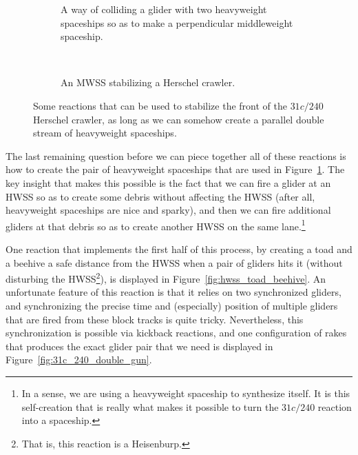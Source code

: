 \begin{figure}[!htb]
	\centering
	\begin{subfigure}[b]{0.43\textwidth}
		\centering
		\caption{A way of colliding a glider with two heavyweight spaceships so as to make a perpendicular middleweight spaceship.}\label{fig:g_2h_to_m}
	\end{subfigure} \ \	\ \ \ \begin{subfigure}[b]{0.53\textwidth}
		\centering
		\caption{An MWSS stabilizing a Herschel crawler.}\label{fig:herschel_mwss_stabilize}
	\end{subfigure}
	\caption{Some reactions that can be used to stabilize the front of the $31c/240$ Herschel crawler, as long as we can somehow create a parallel double stream of heavyweight spaceships.}\label{fig:silverfish_mwss_reactions}
\end{figure}

The last remaining question before we can piece together all of these reactions is how to create the pair of heavyweight spaceships that are used in Figure~\ref{fig:g_2h_to_m}. The key insight that makes this possible is the fact that we can fire a glider at an HWSS so as to create some debris without affecting the HWSS (after all, heavyweight spaceships are nice and sparky), and then we can fire additional gliders at that debris so as to create another HWSS on the same lane.\footnote{In a sense, we are using a heavyweight spaceship to synthesize itself. It is this self-creation that is really what makes it possible to turn the $31c/240$ reaction into a spaceship.}

One reaction that implements the first half of this process, by creating a toad and a beehive a safe distance from the HWSS when a pair of gliders hits it (without disturbing the HWSS\footnote{That is, this reaction is a Heisenburp.}), is displayed in Figure~\ref{fig:hwss_toad_beehive}. An unfortunate feature of this reaction is that it relies on two synchronized gliders, and synchronizing the precise time and (especially) position of multiple gliders that are fired from these block tracks is quite tricky. Nevertheless, this synchronization is possible via kickback reactions, and one configuration of rakes that produces the exact glider pair that we need is displayed in Figure~\ref{fig:31c_240_double_gun}.

